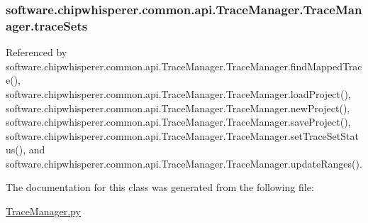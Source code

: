 \hypertarget{classsoftware_1_1chipwhisperer_1_1common_1_1api_1_1TraceManager_1_1TraceManager_a12d367c3f8b7e0fe7270a76e676347b7}{}
\subsubsection[{trace\+Sets}]{\setlength{\rightskip}{0pt plus 5cm}software.\+chipwhisperer.\+common.\+api.\+Trace\+Manager.\+Trace\+Manager.\+trace\+Sets}\label{classsoftware_1_1chipwhisperer_1_1common_1_1api_1_1TraceManager_1_1TraceManager_a12d367c3f8b7e0fe7270a76e676347b7}


Referenced by software.\+chipwhisperer.\+common.\+api.\+Trace\+Manager.\+Trace\+Manager.\+find\+Mapped\+Trace(), software.\+chipwhisperer.\+common.\+api.\+Trace\+Manager.\+Trace\+Manager.\+load\+Project(), software.\+chipwhisperer.\+common.\+api.\+Trace\+Manager.\+Trace\+Manager.\+new\+Project(), software.\+chipwhisperer.\+common.\+api.\+Trace\+Manager.\+Trace\+Manager.\+save\+Project(), software.\+chipwhisperer.\+common.\+api.\+Trace\+Manager.\+Trace\+Manager.\+set\+Trace\+Set\+Status(), and software.\+chipwhisperer.\+common.\+api.\+Trace\+Manager.\+Trace\+Manager.\+update\+Ranges().



The documentation for this class was generated from the following file\+:\begin{DoxyCompactItemize}
\item 
\hyperlink{TraceManager_8py}{Trace\+Manager.\+py}\end{DoxyCompactItemize}
